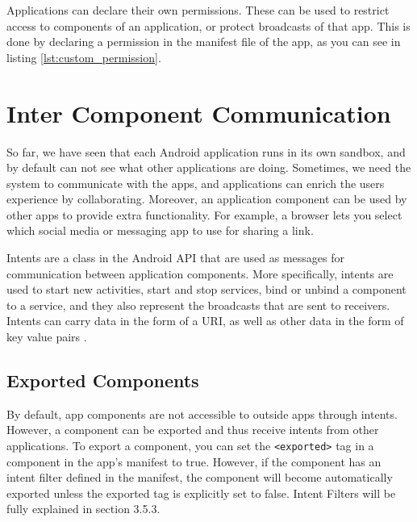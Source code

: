     Applications can declare their own permissions. These can be used to restrict access to components of an application, or protect broadcasts of that app. This is done by declaring a permission in the manifest file of the app, as you can see in listing \ref{lst:custom_permission}.
    
    
    
    \section{Inter Component Communication}
        \label{sec:inter_component_communication}
    
    So far, we have seen that each Android application runs in its own sandbox, and by default can not see what other applications are doing. Sometimes, we need the system to communicate with the apps, and applications can enrich the users experience by collaborating. Moreover, an application component can be used by other apps to provide extra functionality. For example, a browser lets you select which social media or messaging app to use for sharing a link.
    
    Intents are a class in the Android API that are used as messages for communication between application components. More specifically, intents are used to start new activities, start and stop services, bind or unbind a component to a service, and they also represent the broadcasts that are sent to receivers. Intents can carry data in the form of a URI, as well as other data in the form of key value pairs \cite{intents}.
    
    \subsection{Exported Components}
        \label{subsec:exported_components}
        
    By default, app components are not accessible to outside apps through intents. However, a component can be exported and thus receive intents from other applications. To export a component, you can set the \lstinline|<exported>| tag in a component in the app’s manifest to true. However, if the component has an intent filter defined in the manifest, the component will become automatically exported unless the exported tag is explicitly set to false. Intent Filters will be fully explained in section 3.5.3.
    
